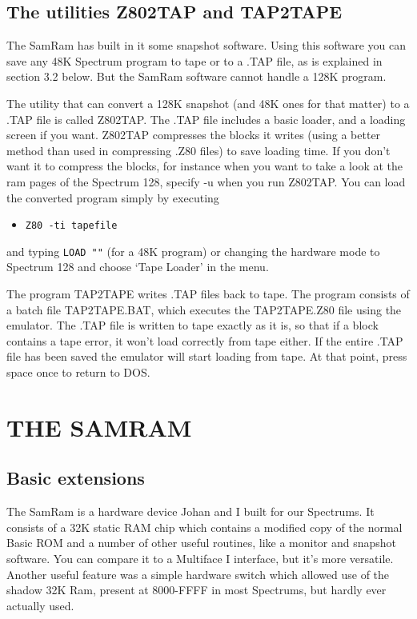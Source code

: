 \subsection{The utilities Z802TAP and TAP2TAPE}

    The SamRam has built in it some snapshot software.  Using this software
    you can save any 48K Spectrum program to tape or to a .TAP file, as is
    explained in section 3.2 below.  But the SamRam software cannot handle a
    128K program.

    The utility that can convert a 128K snapshot (and 48K ones for that
    matter) to a .TAP file is called Z802TAP\@.  The .TAP file includes a
    basic loader, and a loading screen if you want.  Z802TAP compresses the
    blocks it writes (using a better method than used in compressing .Z80
    files) to save loading time.  If you don't want it to compress the
    blocks, for instance when you want to take a look at the ram pages of
    the Spectrum 128, specify -u when you run Z802TAP\@.  You can load the
    converted program simply by executing
\begin{itemize}
  \item[] \verb|Z80 -ti tapefile|
\end{itemize}
    and typing \verb|LOAD ""| (for a 48K program) or changing the hardware
    mode to Spectrum 128 and choose `Tape Loader' in the menu.

    The program TAP2TAPE writes .TAP files back to tape.  The program
    consists of a batch file TAP2TAPE.BAT, which executes the TAP2TAPE.Z80
    file using the emulator.  The .TAP file is written to tape exactly as it
    is, so that if a block contains a tape error, it won't load correctly
    from tape either.  If the entire .TAP file has been saved the emulator
    will start loading from tape.  At that point, press space once to return
    to DOS.

\newpage


\section{THE SAMRAM}


\subsection{Basic extensions}

    The SamRam is a hardware device Johan and I built for our Spectrums.  It
    consists of a 32K static RAM chip which contains a modified copy of the
    normal Basic ROM and a number of other useful routines, like a monitor
    and snapshot software.  You can compare it to a Multiface I interface,
    but it's more versatile.  Another useful feature was a simple hardware
    switch which allowed use of the shadow 32K Ram, present at 8000-FFFF in
    most Spectrums, but hardly ever actually used.

